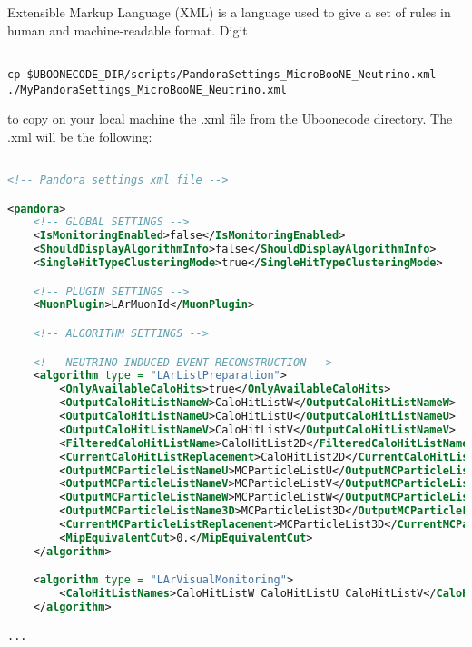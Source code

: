 Extensible Markup Language (XML) is a language used to give a set of rules in human and machine-readable format. Digit 

\begin{verbatim}

cp $UBOONECODE_DIR/scripts/PandoraSettings_MicroBooNE_Neutrino.xml ./MyPandoraSettings_MicroBooNE_Neutrino.xml

\end{verbatim}

to copy on your local machine the .xml file from the Uboonecode directory. The .xml will be the following:

\begin{lstlisting}[language=XML, caption=Python example]

<!-- Pandora settings xml file -->

<pandora>
    <!-- GLOBAL SETTINGS -->
    <IsMonitoringEnabled>false</IsMonitoringEnabled>
    <ShouldDisplayAlgorithmInfo>false</ShouldDisplayAlgorithmInfo>
    <SingleHitTypeClusteringMode>true</SingleHitTypeClusteringMode>

    <!-- PLUGIN SETTINGS -->
    <MuonPlugin>LArMuonId</MuonPlugin>

    <!-- ALGORITHM SETTINGS -->

    <!-- NEUTRINO-INDUCED EVENT RECONSTRUCTION -->
    <algorithm type = "LArListPreparation">
        <OnlyAvailableCaloHits>true</OnlyAvailableCaloHits>
        <OutputCaloHitListNameW>CaloHitListW</OutputCaloHitListNameW>
        <OutputCaloHitListNameU>CaloHitListU</OutputCaloHitListNameU>
        <OutputCaloHitListNameV>CaloHitListV</OutputCaloHitListNameV>
        <FilteredCaloHitListName>CaloHitList2D</FilteredCaloHitListName>
        <CurrentCaloHitListReplacement>CaloHitList2D</CurrentCaloHitListReplacement>
        <OutputMCParticleListNameU>MCParticleListU</OutputMCParticleListNameU>
        <OutputMCParticleListNameV>MCParticleListV</OutputMCParticleListNameV>
        <OutputMCParticleListNameW>MCParticleListW</OutputMCParticleListNameW>
        <OutputMCParticleListName3D>MCParticleList3D</OutputMCParticleListName3D>
        <CurrentMCParticleListReplacement>MCParticleList3D</CurrentMCParticleListReplacement>
        <MipEquivalentCut>0.</MipEquivalentCut>
    </algorithm>

    <algorithm type = "LArVisualMonitoring">
        <CaloHitListNames>CaloHitListW CaloHitListU CaloHitListV</CaloHitListNames>
    </algorithm>

...

\end{lstlisting}

